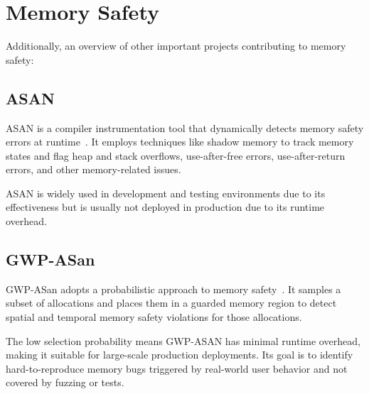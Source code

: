 \section{Memory Safety}
\label{sec:related-memory-safety}

Additionally, an overview of other important projects contributing to memory safety:

\subsection{ASAN}
\label{subsec:related-asan}

\ac{ASAN} is a compiler instrumentation tool that dynamically detects memory safety errors at runtime~\cite{serebryany2012addresssanitizer}.
It employs techniques like shadow memory to track memory states and flag heap and stack overflows, use-after-free errors, use-after-return errors, and other memory-related issues.

\ac{ASAN} is widely used in development and testing environments due to its effectiveness but is usually not deployed in production due to its runtime overhead.

\subsection{GWP-ASan}
\label{subsec:gwp-asan}

GWP-ASan adopts a probabilistic approach to memory safety~\cite{serebryany2023gwp}.
It samples a subset of allocations and places them in a guarded memory region to detect spatial and temporal memory safety violations for those allocations.

The low selection probability means GWP-ASAN has minimal runtime overhead, making it suitable for large-scale production deployments.
Its goal is to identify hard-to-reproduce memory bugs triggered by real-world user behavior and not covered by fuzzing or tests.
